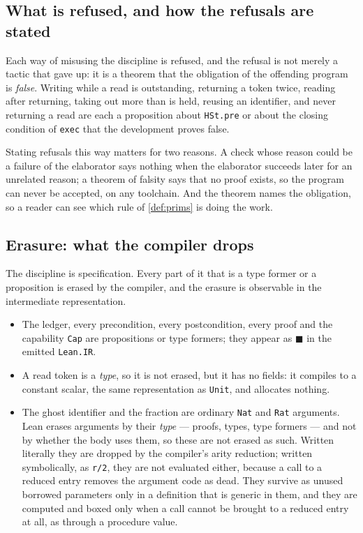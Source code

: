 \documentclass[11pt,a4paper]{article}
\theoremstyle{definition}
\theoremstyle{plain}
\newcommand{\code}[1]{\texttt{#1}}
\begin{document}
\subsection{What is refused, and how the refusals are stated}

Each way of misusing the discipline is refused, and the refusal is not merely a
tactic that gave up: it is a theorem that the obligation of the offending
program is \emph{false}. Writing while a read is outstanding, returning a token
twice, reading after returning, taking out more than is held, reusing an
identifier, and never returning a read are each a proposition about
\code{HSt.pre} or about the closing condition of \code{exec} that the
development proves false.

Stating refusals this way matters for two reasons. A check whose reason could be
a failure of the elaborator says nothing when the elaborator succeeds later for
an unrelated reason; a theorem of falsity says that no proof exists, so the
program can never be accepted, on any toolchain. And the theorem names the
obligation, so a reader can see which rule of \cref{def:prims} is doing the work.

\subsection{Erasure: what the compiler drops}

The discipline is specification. Every part of it that is a type former or a
proposition is erased by the compiler, and the erasure is observable in the
intermediate representation.

\begin{itemize}[leftmargin=1.4em,itemsep=2pt]
\item The ledger, every precondition, every postcondition, every proof and the
capability \code{Cap} are propositions or type formers; they appear as $\blacksquare$
in the emitted \code{Lean.IR}.
\item A read token is a \emph{type}, so it is not erased, but it has no fields:
it compiles to a constant scalar, the same representation as \code{Unit}, and
allocates nothing.
\item The ghost identifier and the fraction are ordinary \code{Nat} and
\code{Rat} arguments. Lean erases arguments by their \emph{type} --- proofs,
types, type formers --- and not by whether the body uses them, so these are not
erased as such. Written literally they are dropped by the compiler's arity
reduction; written symbolically, as \code{r/2}, they are not evaluated either,
because a call to a reduced entry removes the argument code as dead. They survive
as unused borrowed parameters only in a definition that is generic in them, and
they are computed and boxed only when a call cannot be brought to a reduced
entry at all, as through a procedure value.
\end{itemize}
\end{document}
